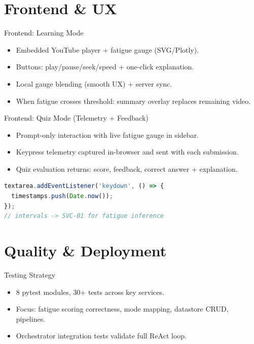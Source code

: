 \documentclass{sdqbeamer}
\begin{document}
\section{Frontend \& UX}

\begin{frame}{Frontend: Learning Mode}
\begin{itemize}
  \item Embedded YouTube player + fatigue gauge (SVG/Plotly).
  \item Buttons: play/pause/seek/speed + one-click explanation.
  \item Local gauge blending (smooth UX) + server sync.
  \item When fatigue crosses threshold: summary overlay replaces remaining video.
\end{itemize}
\end{frame}

\begin{frame}[fragile]{Frontend: Quiz Mode (Telemetry + Feedback)}
\begin{itemize}
  \item Prompt-only interaction with live fatigue gauge in sidebar.
  \item Keypress telemetry captured in-browser and sent with each submission.
  \item Quiz evaluation returns: score, feedback, correct answer + explanation.
\end{itemize}
\vspace{1mm}
\begin{lstlisting}[language=JavaScript]
textarea.addEventListener('keydown', () => {
  timestamps.push(Date.now());
});
// intervals -> SVC-01 for fatigue inference
\end{lstlisting}
\end{frame}

\section{Quality \& Deployment}

\begin{frame}{Testing Strategy}
\begin{itemize}
  \item 8 pytest modules, 30+ tests across key services.
  \item Focus: fatigue scoring correctness, mode mapping, datastore CRUD, pipelines.
  \item Orchestrator integration tests validate full ReAct loop.
\end{itemize}
\end{frame}
\end{document}
